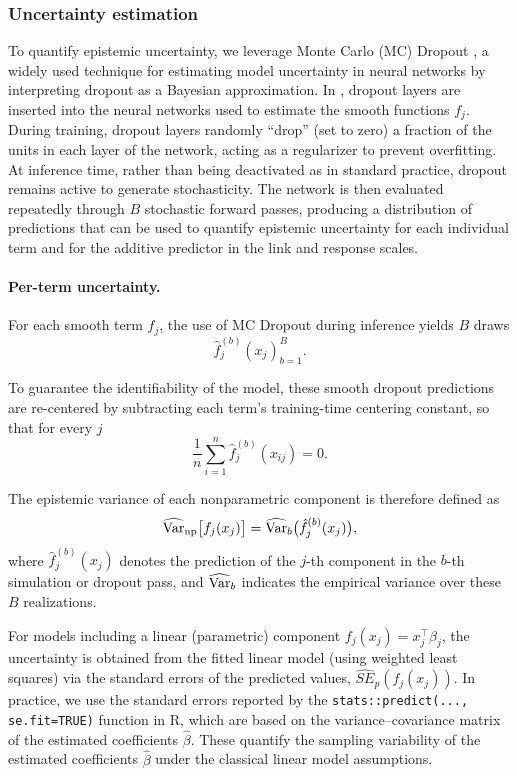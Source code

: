 \subsubsection{Uncertainty estimation}
\label{sec:uncertainty}

To quantify epistemic uncertainty, we leverage Monte Carlo (MC) Dropout \citep{gal2016dropout}, a widely used technique for estimating model uncertainty in neural networks by interpreting dropout as a Bayesian approximation. In , dropout layers are inserted into the neural networks used to estimate the smooth functions $f_j$. During training, dropout layers randomly ``drop'' (set to zero) a fraction of the units in each layer of the network, acting as a regularizer to prevent overfitting. At inference time, rather than being deactivated as in standard practice, dropout remains active to generate stochasticity. The network is then evaluated repeatedly through $B$ stochastic forward passes, producing a distribution of predictions that can be used to quantify epistemic uncertainty for each individual term and for the additive predictor in the link and response scales.

\paragraph{Per-term uncertainty.}

For each smooth term $f_j$, the use of MC Dropout during inference yields $B$ draws
\[
\hat f_j^{(b)}(x_j)_{b=1}^B.
\] 

To guarantee the identifiability of the model, these smooth dropout predictions are re-centered by subtracting each term’s training-time centering constant, so that for every $j$
\[\frac{1}{n}\sum_{i=1}^n \hat f_j^{(b)}(x_{ij}) = 0.\]

The epistemic variance of each nonparametric component is therefore defined as 
\[
\widehat{\mathrm{Var}}_{\text{np}}\bigl[f_j(x_j)\bigr] = \widehat{\mathrm{Var}}_b\bigl(\hat f_j^{(b)}(x_j)\bigr),
\]
where $\hat f_j^{(b)}(x_j)$ denotes the prediction of the $j$-th component in the $b$-th simulation or dropout pass, and $\widehat{\mathrm{Var}}_b$ indicates the empirical variance over these $B$ realizations.

For models including a linear (parametric) component $f_j(x_j)= x_j^\top \beta_j $, the uncertainty is obtained from the fitted linear model (using weighted least squares) via the standard errors of the predicted values, $\widehat{SE}_p(f_j(x_j))$. In practice, we use the standard errors reported by the \texttt{stats::predict(..., se.fit=TRUE)} function in \textsf{R}, which are based on the variance--covariance matrix of the estimated coefficients $\hat\beta$. These quantify the sampling variability of the estimated coefficients $\hat\beta$ under the classical linear model assumptions. 

